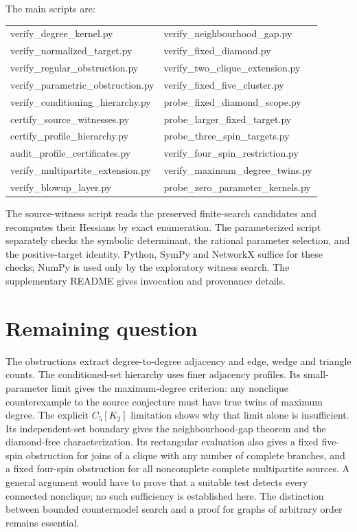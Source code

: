 \documentclass[11pt]{article}
\theoremstyle{remark}
\begin{document}
\noindent\begin{minipage}{\textwidth}
The main scripts are:
\begin{flushleft}\ttfamily
\begin{tabular}{@{}ll@{}}
verify\_degree\_kernel.py & verify\_neighbourhood\_gap.py\\
verify\_normalized\_target.py & verify\_fixed\_diamond.py\\
verify\_regular\_obstruction.py & verify\_two\_clique\_extension.py\\
verify\_parametric\_obstruction.py & verify\_fixed\_five\_cluster.py\\
verify\_conditioning\_hierarchy.py & probe\_fixed\_diamond\_scope.py\\
certify\_source\_witnesses.py & probe\_larger\_fixed\_target.py\\
certify\_profile\_hierarchy.py & probe\_three\_spin\_targets.py\\
audit\_profile\_certificates.py & verify\_four\_spin\_restriction.py\\
verify\_multipartite\_extension.py & verify\_maximum\_degree\_twins.py\\
verify\_blowup\_layer.py & probe\_zero\_parameter\_kernels.py\\
\end{tabular}
\end{flushleft}
\end{minipage}\par\medskip
The source-witness script reads the preserved finite-search candidates and
recomputes their Hessians by exact enumeration.
The parameterized script separately checks the symbolic determinant,
the rational parameter selection, and the positive-target identity.
Python, SymPy and NetworkX suffice for these checks; NumPy is used
only by the exploratory witness search.
The supplementary README gives invocation and provenance details.

\section{Remaining question}
The obstructions extract degree-to-degree adjacency and
edge, wedge and triangle counts. The conditioned-set hierarchy
uses finer adjacency profiles. Its small-parameter limit gives the
maximum-degree criterion: any nonclique counterexample to the source
conjecture must have true twins of maximum degree. The explicit
$C_5[K_2]$ limitation shows why that limit alone is insufficient. Its independent-set boundary gives
the neighbourhood-gap theorem and the diamond-free characterization.
Its rectangular evaluation also gives a fixed five-spin obstruction
for joins of a clique with any number of complete branches, and a
fixed four-spin obstruction for all noncomplete complete multipartite
sources.
A general argument would have to prove that a suitable test detects
every connected nonclique; no such sufficiency is established here.
The distinction between bounded
countermodel search and a proof for graphs of arbitrary order remains
essential.
\end{document}
